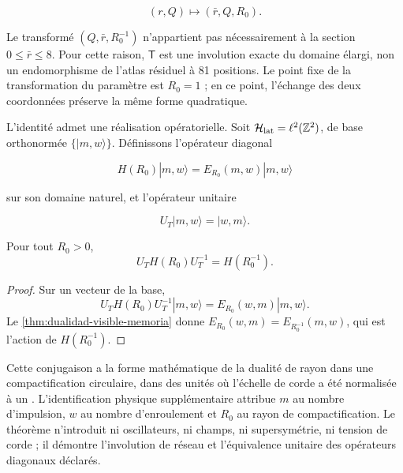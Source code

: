 \[
(r,Q)\longmapsto(\bar r,Q,R_0).
\]

Le transformé \((Q,\bar r,R_0^{-1})\) n'appartient pas nécessairement à la
section \(0\leq\bar r\leq8\). Pour cette raison, \(\mathsf T\) est une
involution exacte du domaine élargi, non un endomorphisme de l'atlas résiduel
à 81 positions. Le point fixe de la transformation du paramètre est
\(R_0=1\) ; en ce point, l'échange des deux coordonnées préserve la même forme
quadratique.

L'identité admet une réalisation opératorielle. Soit
\(\mathcal H_{\rm lat}=\ell^2(\mathbb Z^2)\), de base orthonormée
\(\{|m,w\rangle\}\). Définissons l'opérateur diagonal

\[
H(R_0)|m,w\rangle=E_{R_0}(m,w)|m,w\rangle
\]

sur son domaine naturel, et l'opérateur unitaire

\[
U_T|m,w\rangle=|w,m\rangle.
\]

\begin{corollary}
\label{cor:dualidad-unitaria}
Pour tout \(R_0>0\),
\[
U_TH(R_0)U_T^{-1}=H(R_0^{-1}).
\]
\end{corollary}

\begin{proof}
Sur un vecteur de la base,
\[
U_TH(R_0)U_T^{-1}|m,w\rangle
=E_{R_0}(w,m)|m,w\rangle.
\]
Le \cref{thm:dualidad-visible-memoria} donne
\(E_{R_0}(w,m)=E_{R_0^{-1}}(m,w)\), qui est l'action de
\(H(R_0^{-1})\).
\end{proof}

Cette conjugaison a la forme mathématique de la dualité de rayon dans une
compactification circulaire, dans des unités où l'échelle de corde a été
normalisée à un \cite{Giveon1994}. L'identification physique supplémentaire
attribue \(m\) au nombre d'impulsion, \(w\) au nombre d'enroulement et \(R_0\)
au rayon de compactification. Le théorème n'introduit ni oscillateurs, ni champs,
ni supersymétrie, ni tension de corde ; il démontre l'involution de réseau et
l'équivalence unitaire des opérateurs diagonaux déclarés.
